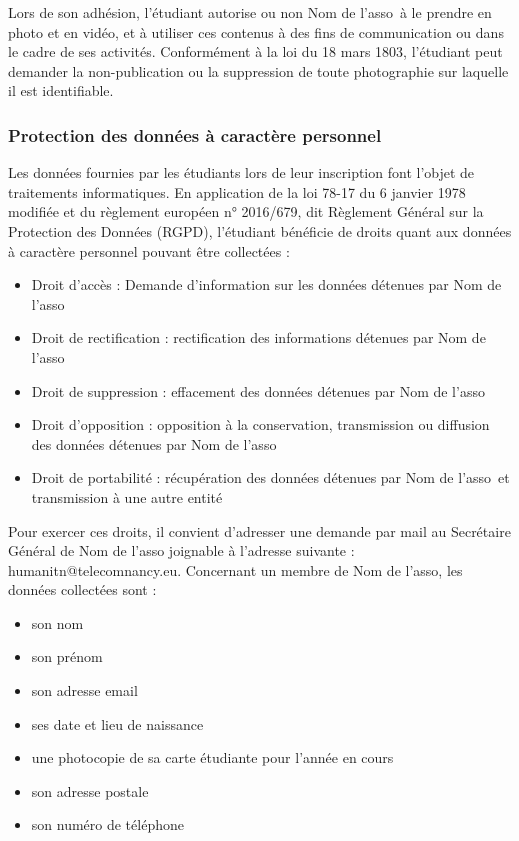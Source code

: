 \documentclass[12pt]{article}
\newcommand{\asso}{Nom de l'asso}
\begin{document}
Lors de son adhésion, l’étudiant autorise ou non \asso~à le prendre en photo et en vidéo, et à utiliser ces
contenus à des fins de communication ou dans le cadre de ses activités.
Conformément à la loi du 18 mars 1803, l’étudiant peut demander la non-publication ou la suppression de
toute photographie sur laquelle il est identifiable.

\subsubsection{Protection des données à caractère personnel}
\label{sec:membres:droit:données}

Les données fournies par les étudiants lors de leur inscription font l’objet de traitements informatiques. En
application de la loi 78-17 du 6 janvier 1978 modifiée et du règlement européen n° 2016/679, dit Règlement
Général sur la Protection des Données (RGPD), l’étudiant bénéficie de droits quant aux données à caractère
personnel pouvant être collectées :
\begin{itemize}
	\item Droit d’accès : Demande d’information sur les données détenues par \asso
	\item Droit de rectification : rectification des informations détenues par \asso
	\item Droit de suppression : effacement des données détenues par \asso
	\item Droit d’opposition : opposition à la conservation, transmission ou diffusion des données détenues par
\asso
	\item Droit de portabilité : récupération des données détenues par \asso~et transmission à une autre
entité
\end{itemize}

Pour exercer ces droits, il convient d’adresser une demande par mail au Secrétaire Général de \asso
joignable à l’adresse suivante : humanitn@telecomnancy.eu.
Concernant un membre de \asso, les données collectées sont :
\begin{itemize}
	\item son nom
	\item son prénom
	\item son adresse email
	\item ses date et lieu de naissance
	\item une photocopie de sa carte étudiante pour l’année en cours
	\item son adresse postale
	\item son numéro de téléphone
\end{itemize}
\end{document}
